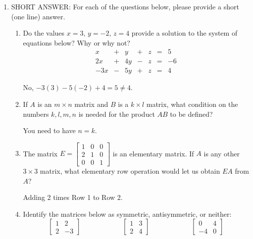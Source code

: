 \documentclass[12pt]{article}
\newcommand{\points}[1]{\marginpar{\hspace{24pt}[#1]}}
\begin{document}
\begin{enumerate}
\item SHORT ANSWER: For each of the questions below, please provide a short (one line) answer.
 \begin{enumerate}
\item Do the values $x=3$, $y=-2$, $z=4$ provide a solution to the system of equations below? Why or why not?\points{2}
\[
\begin{array}{ccccccc}
x&+&y&+&z&=&5\\
2x&+&4y&-&z&=&-6\\
-3x&-&5y&+&z&=&4
\end{array}
\]

\bigskip

 No, $-3(3)-5(-2)+4=5\neq 4$.

\bigskip

\item If $A$ is an $m\times n$ matrix and $B$ is a $k\times l$ matrix, what condition on the numbers $k,l,m,n$ is needed for the product $AB$ to be defined? \points{2}

\bigskip

 You need to have $n=k$.

\bigskip

\item The matrix $E=\begin{bmatrix}
1&0&0\\2&1&0\\0&0&1
\end{bmatrix}$ is an elementary matrix. If $A$ is any other $3\times 3$ matrix, what elementary row operation would let us obtain $EA$ from $A$? \points{2}


\bigskip

 Adding 2 times Row 1 to Row 2.

\bigskip

\item Identify the matrices below as symmetric, antisymmetric, or neither: \points{2}
\[
\begin{bmatrix}
1&2\\2&-3
\end{bmatrix}\hspace{1in} \begin{bmatrix}
1&3\\2&4
\end{bmatrix}\hspace{1in} \begin{bmatrix}
0&4\\-4&0
\end{bmatrix}
\]


\end{enumerate}
\end{enumerate}
\end{document}
